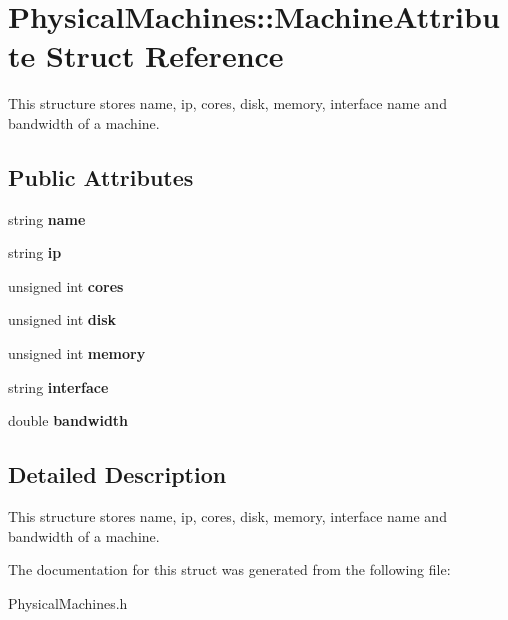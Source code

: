 \hypertarget{structPhysicalMachines_1_1MachineAttribute}{\section{\-Physical\-Machines\-:\-:\-Machine\-Attribute \-Struct \-Reference}
\label{structPhysicalMachines_1_1MachineAttribute}
}


\-This structure stores name, ip, cores, disk, memory, interface name and bandwidth of a machine.  


\subsection*{\-Public \-Attributes}
\begin{DoxyCompactItemize}
\item 
\hypertarget{structPhysicalMachines_1_1MachineAttribute_af1f8e102712af818656a8146319058a2}{string {\bfseries name}}\label{structPhysicalMachines_1_1MachineAttribute_af1f8e102712af818656a8146319058a2}

\item 
\hypertarget{structPhysicalMachines_1_1MachineAttribute_a45126c5d23ddfcb4fe63f7232711f418}{string {\bfseries ip}}\label{structPhysicalMachines_1_1MachineAttribute_a45126c5d23ddfcb4fe63f7232711f418}

\item 
\hypertarget{structPhysicalMachines_1_1MachineAttribute_a4e674bca980da4d0ed057be71191f918}{unsigned int {\bfseries cores}}\label{structPhysicalMachines_1_1MachineAttribute_a4e674bca980da4d0ed057be71191f918}

\item 
\hypertarget{structPhysicalMachines_1_1MachineAttribute_a22a3e2856d1d5415f11fdad0abc8fa31}{unsigned int {\bfseries disk}}\label{structPhysicalMachines_1_1MachineAttribute_a22a3e2856d1d5415f11fdad0abc8fa31}

\item 
\hypertarget{structPhysicalMachines_1_1MachineAttribute_a4057ca8fcf9b95a94fb4c92d0d21f47e}{unsigned int {\bfseries memory}}\label{structPhysicalMachines_1_1MachineAttribute_a4057ca8fcf9b95a94fb4c92d0d21f47e}

\item 
\hypertarget{structPhysicalMachines_1_1MachineAttribute_aba2853127f55abf1e280218d0aec39fc}{string {\bfseries interface}}\label{structPhysicalMachines_1_1MachineAttribute_aba2853127f55abf1e280218d0aec39fc}

\item 
\hypertarget{structPhysicalMachines_1_1MachineAttribute_a073ef80db31b56d7cdf2195c609b7110}{double {\bfseries bandwidth}}\label{structPhysicalMachines_1_1MachineAttribute_a073ef80db31b56d7cdf2195c609b7110}

\end{DoxyCompactItemize}


\subsection{\-Detailed \-Description}
\-This structure stores name, ip, cores, disk, memory, interface name and bandwidth of a machine. 

\-The documentation for this struct was generated from the following file\-:\begin{DoxyCompactItemize}
\item 
\-Physical\-Machines.\-h\end{DoxyCompactItemize}
